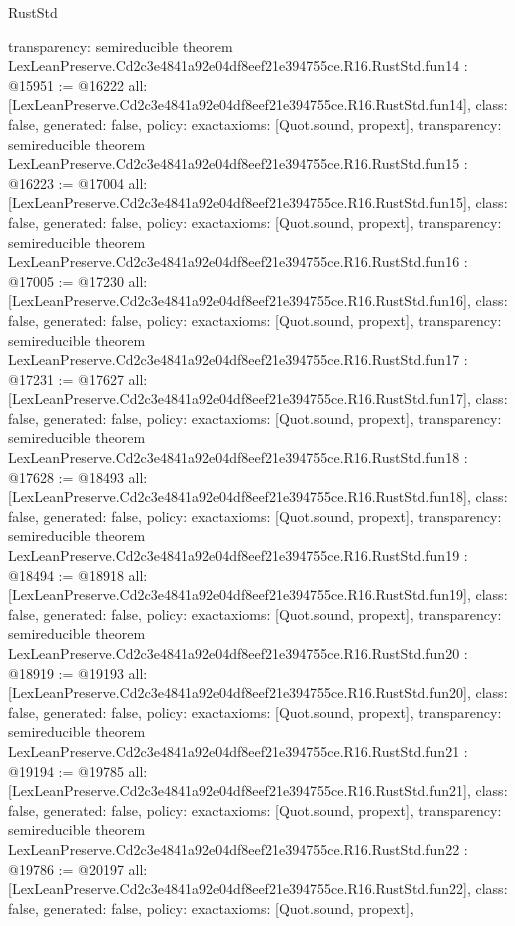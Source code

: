 \begin{lexlean}{RustStd}
\begin{coremodule}
{  transparency: semireducible
}
theorem LexLeanPreserve.Cd2c3e4841a92e04df8eef21e394755ce.R16.RustStd.fun14 : @15951 := @16222 {
  all: [LexLeanPreserve.Cd2c3e4841a92e04df8eef21e394755ce.R16.RustStd.fun14],
  class: false,
  generated: false,
  policy: exact{axioms: [Quot.sound, propext]},
  transparency: semireducible
}
theorem LexLeanPreserve.Cd2c3e4841a92e04df8eef21e394755ce.R16.RustStd.fun15 : @16223 := @17004 {
  all: [LexLeanPreserve.Cd2c3e4841a92e04df8eef21e394755ce.R16.RustStd.fun15],
  class: false,
  generated: false,
  policy: exact{axioms: [Quot.sound, propext]},
  transparency: semireducible
}
theorem LexLeanPreserve.Cd2c3e4841a92e04df8eef21e394755ce.R16.RustStd.fun16 : @17005 := @17230 {
  all: [LexLeanPreserve.Cd2c3e4841a92e04df8eef21e394755ce.R16.RustStd.fun16],
  class: false,
  generated: false,
  policy: exact{axioms: [Quot.sound, propext]},
  transparency: semireducible
}
theorem LexLeanPreserve.Cd2c3e4841a92e04df8eef21e394755ce.R16.RustStd.fun17 : @17231 := @17627 {
  all: [LexLeanPreserve.Cd2c3e4841a92e04df8eef21e394755ce.R16.RustStd.fun17],
  class: false,
  generated: false,
  policy: exact{axioms: [Quot.sound, propext]},
  transparency: semireducible
}
theorem LexLeanPreserve.Cd2c3e4841a92e04df8eef21e394755ce.R16.RustStd.fun18 : @17628 := @18493 {
  all: [LexLeanPreserve.Cd2c3e4841a92e04df8eef21e394755ce.R16.RustStd.fun18],
  class: false,
  generated: false,
  policy: exact{axioms: [Quot.sound, propext]},
  transparency: semireducible
}
theorem LexLeanPreserve.Cd2c3e4841a92e04df8eef21e394755ce.R16.RustStd.fun19 : @18494 := @18918 {
  all: [LexLeanPreserve.Cd2c3e4841a92e04df8eef21e394755ce.R16.RustStd.fun19],
  class: false,
  generated: false,
  policy: exact{axioms: [Quot.sound, propext]},
  transparency: semireducible
}
theorem LexLeanPreserve.Cd2c3e4841a92e04df8eef21e394755ce.R16.RustStd.fun20 : @18919 := @19193 {
  all: [LexLeanPreserve.Cd2c3e4841a92e04df8eef21e394755ce.R16.RustStd.fun20],
  class: false,
  generated: false,
  policy: exact{axioms: [Quot.sound, propext]},
  transparency: semireducible
}
theorem LexLeanPreserve.Cd2c3e4841a92e04df8eef21e394755ce.R16.RustStd.fun21 : @19194 := @19785 {
  all: [LexLeanPreserve.Cd2c3e4841a92e04df8eef21e394755ce.R16.RustStd.fun21],
  class: false,
  generated: false,
  policy: exact{axioms: [Quot.sound, propext]},
  transparency: semireducible
}
theorem LexLeanPreserve.Cd2c3e4841a92e04df8eef21e394755ce.R16.RustStd.fun22 : @19786 := @20197 {
  all: [LexLeanPreserve.Cd2c3e4841a92e04df8eef21e394755ce.R16.RustStd.fun22],
  class: false,
  generated: false,
  policy: exact{axioms: [Quot.sound, propext]},
}
\end{coremodule}
\end{lexlean}
